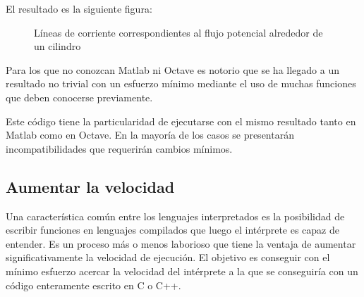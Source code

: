 \documentclass[10pt,letterpaper,conference]{ieeeconfspanish}
\begin{document}
El resultado es la siguiente figura:
\begin{figure}[htbp]\begin{center}
\caption{Líneas de corriente correspondientes al flujo potencial alrededor de un cilindro}
\end{center}\end{figure}

Para los que no conozcan Matlab ni Octave es notorio que se ha llegado
a un resultado no trivial con un esfuerzo mínimo mediante el uso de
muchas funciones que deben conocerse previamente.

Este código tiene la particularidad de ejecutarse con el mismo
resultado tanto en Matlab como en Octave.  En la mayoría de los casos
se presentarán incompatibilidades que requerirán cambios mínimos.



\hypertarget{aumentar-la-velocidad}{}
\subsection*{Aumentar la velocidad}

Una característica común entre los lenguajes interpretados es la
posibilidad de escribir funciones en lenguajes compilados que luego el
intérprete es capaz de entender.  Es un proceso más o menos laborioso
que tiene la ventaja de aumentar significativamente la velocidad de
ejecución.  El objetivo es conseguir con el mínimo esfuerzo acercar la
velocidad del intérprete a la que se conseguiría con un código
enteramente escrito en C o C++.
\end{document}
